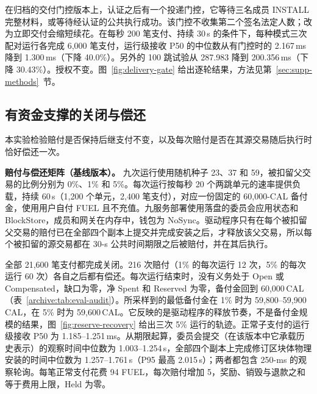 在归档的交付门控版本上，认证之后有一个投递门控，它等待三名成员 INSTALL 完整材料，或等待经认证的公共执行成功。该门控不收集第二个签名法定人数；改为立即交付会缩短续花。在每秒 200 笔支付、持续 30\,s 的条件下，每种模式三次配对运行各完成 6,000 笔支付，运行级接收 P50 的中位数从有门控时的 2.167\,ms 降到 1.300\,ms（下降 40.0\%）。另外的 100 跳试验从 287.983 降到 200.356\,ms（下降 30.43\%）。授权不变。图~\ref{fig:delivery-gate} 给出逐轮结果，方法见第~\ref{sec:supp-methods}~节。

\subsection{有资金支撑的关闭与偿还}
\label{archive:sec:eval-liabilities}

本实验检验赔付是否保持后继支付不变，以及每次赔付是否在其源交易随后执行时恰好偿还一次。

\noindent\textbf{赔付与偿还矩阵（基线版本）。}
九次运行使用随机种子 23、37 和 59，被扣留父交易的比例分别为 0\%、1\% 和 5\%。每次运行按每秒 20 个两跳单元的速率提供负载，持续 60\,s（1,200 个单元，2,400 笔支付），对应一份固定的 60,000-CAL 备付金，使用用户自付 FUEL 且不充值。九服务部署使用落盘的委员会应用状态和 BlockStore，成员和网关在内存中，钱包为 NoSync。驱动程序只有在每个被扣留父交易的赔付已在全部四个副本上提交并完成安装之后，才释放该父交易，所以每个被扣留的源交易都在 30-s 公共时间期限之后被赔付，并在其后执行。

全部 21,600 笔支付都完成关闭。216 次赔付（1\% 的每次运行 12 次，5\% 的每次运行 60 次）各自之后都有偿还。每次运行结束时，没有义务处于 Open 或 Compensated，缺口为零，净 Spent 和 Reserved 为零，备付金回到 60,000\,CAL（表~\ref{archive:tab:eval-audit}）。所采样到的最低备付金在 1\% 时为 59,800--59,900\,CAL，在 5\% 时为 59,600\,CAL。它反映的是驱动程序的释放节奏，不是备付金规模的结果，图~\ref{fig:reserve-recovery} 给出三次 5\% 运行的轨迹。正常子支付的运行级接收 P50 为 1.185--1.251\,ms。从期限起算，委员会提交（在该版本中它承载历史表示）的观察时间中位数为 1.003--1.254\,s，全部四个副本上完成修订区块体物理安装的时间中位数为 1.257--1.761\,s（P95 最高 2.015\,s）；两者都包含 250-ms 的观察轮询。每笔正常支付花费 94 FUEL，每次赔付增加 5，奖励、销毁与退款之和等于费用上限，Held 为零。

